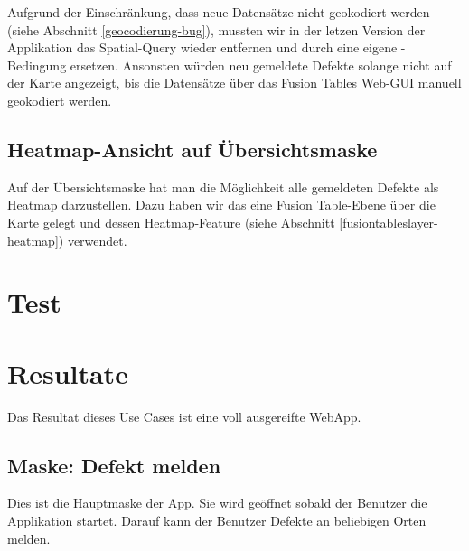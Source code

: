 Aufgrund der Einschränkung, dass neue Datensätze nicht geokodiert werden (siehe Abschnitt \ref{geocodierung-bug}), mussten wir in der letzen Version der Applikation das Spatial-Query wieder entfernen und durch eine eigene -Bedingung ersetzen. Ansonsten würden neu gemeldete Defekte solange nicht auf der Karte angezeigt, bis die Datensätze über das Fusion Tables Web-GUI manuell geokodiert werden.

\subsection{Heatmap-Ansicht auf Übersichtsmaske}
\label{fixmystreet-heatmap}
Auf der Übersichtsmaske hat man die Möglichkeit alle gemeldeten Defekte als Heatmap darzustellen. Dazu haben wir das eine Fusion Table-Ebene über die Karte gelegt und dessen Heatmap-Feature (siehe Abschnitt \ref{fusiontableslayer-heatmap}) verwendet. 

\section{Test}

\section{Resultate}
Das Resultat dieses Use Cases ist eine voll ausgereifte WebApp. 

\subsection{Maske: Defekt melden}
Dies ist die Hauptmaske der App. Sie wird geöffnet sobald der Benutzer die Applikation startet. Darauf kann der Benutzer Defekte an beliebigen Orten melden.

